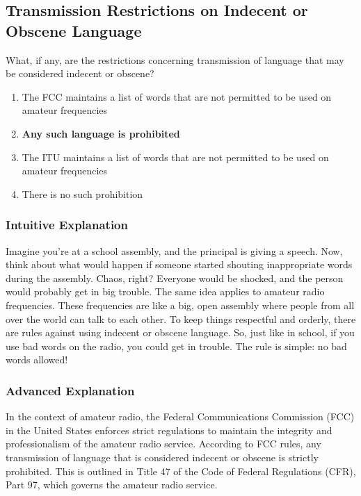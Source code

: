 \subsection{Transmission Restrictions on Indecent or Obscene Language}
\label{T1D06}

\begin{tcolorbox}[colback=gray!10!white,colframe=black!75!black,title=T1D06]
What, if any, are the restrictions concerning transmission of language that may be considered indecent or obscene?
\begin{enumerate}[label=\Alph*]
    \item The FCC maintains a list of words that are not permitted to be used on amateur frequencies
    \item \textbf{Any such language is prohibited}
    \item The ITU maintains a list of words that are not permitted to be used on amateur frequencies
    \item There is no such prohibition
\end{enumerate}
\end{tcolorbox}

\subsubsection{Intuitive Explanation}
Imagine you're at a school assembly, and the principal is giving a speech. Now, think about what would happen if someone started shouting inappropriate words during the assembly. Chaos, right? Everyone would be shocked, and the person would probably get in big trouble. The same idea applies to amateur radio frequencies. These frequencies are like a big, open assembly where people from all over the world can talk to each other. To keep things respectful and orderly, there are rules against using indecent or obscene language. So, just like in school, if you use bad words on the radio, you could get in trouble. The rule is simple: no bad words allowed!

\subsubsection{Advanced Explanation}
In the context of amateur radio, the Federal Communications Commission (FCC) in the United States enforces strict regulations to maintain the integrity and professionalism of the amateur radio service. According to FCC rules, any transmission of language that is considered indecent or obscene is strictly prohibited. This is outlined in Title 47 of the Code of Federal Regulations (CFR), Part 97, which governs the amateur radio service.

